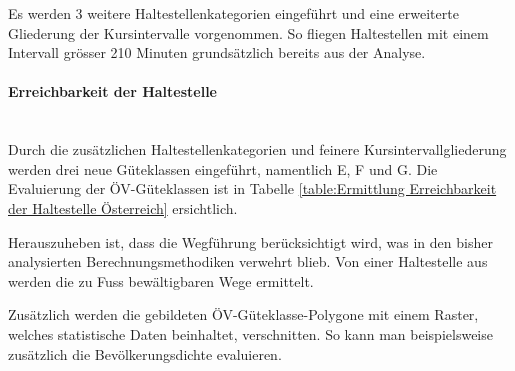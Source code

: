 Es werden 3 weitere Haltestellenkategorien eingeführt und eine erweiterte Gliederung der Kursintervalle vorgenommen.
So fliegen Haltestellen mit einem Intervall grösser 210 Minuten grundsätzlich bereits aus der Analyse.

\paragraph{Erreichbarkeit der Haltestelle}~\\
\label{Berechnungsmethodik Österreich:Erreichbarkeit der Haltestelle}
Durch die zusätzlichen Haltestellenkategorien und feinere Kursintervallgliederung werden drei neue Güteklassen eingeführt, namentlich E, F und G.
Die Evaluierung der \acs{ÖV}-Güteklassen ist in Tabelle \ref{table:Ermittlung Erreichbarkeit der Haltestelle Österreich} ersichtlich.

Herauszuheben ist, dass die Wegführung berücksichtigt wird, was in den bisher analysierten Berechnungsmethodiken verwehrt blieb.
Von einer Haltestelle aus werden die zu Fuss bewältigbaren Wege ermittelt.

Zusätzlich werden die gebildeten \acs{ÖV}-Güteklasse-Polygone mit einem Raster, welches statistische Daten beinhaltet, verschnitten.
So kann man beispielsweise zusätzlich die Bevölkerungsdichte evaluieren.


